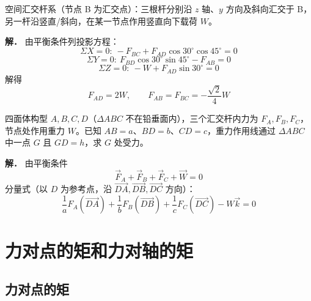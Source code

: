 \begin{example}
空间汇交杆系（节点 B 为汇交点）：三根杆分别沿 $z$ 轴、$y$ 方向及斜向汇交于 B，另一杆沿竖直/斜向，在某一节点作用竖直向下载荷 $W$。

\textbf{解．} 由平衡条件列投影方程：
\begin{equation}
\Sigma X=0:\ -F_{BC}+F_{AD}\cos30^\circ\cos45^\circ=0
\label{eq:3-例1-X}
\end{equation}
\begin{equation}
\Sigma Y=0:\ F_{BD}\cos30^\circ\sin45^\circ-F_{AB}=0
\label{eq:3-例1-Y}
\end{equation}
\begin{equation}
\Sigma Z=0:\ -W+F_{AD}\sin30^\circ=0
\label{eq:3-例1-Z}
\end{equation}
解得
\begin{equation}
F_{AD}=2W,\qquad F_{AB}=F_{BC}=-\frac{\sqrt{2}}{4}W
\label{eq:3-例1-结果}
\end{equation}
\end{example}

\begin{example}
四面体构型 $A,B,C,D$（$\Delta ABC$ 不在铅垂面内），三个汇交杆内力为 $F_A,F_B,F_C$，节点处作用重力 $W$。已知 $AB=a$、$BD=b$、$CD=c$，重力作用线通过 $\Delta ABC$ 中一点 $G$ 且 $GD=h$，求 $G$ 处受力。

\textbf{解．} 由平衡条件
\begin{equation}
\vec{F}_A+\vec{F}_B+\vec{F}_C+\vec{W}=0
\label{eq:3-例2-平衡}
\end{equation}
分量式（以 $D$ 为参考点，沿 $\vec{DA},\vec{DB},\vec{DC}$ 方向）：
\begin{equation}
\frac{1}{a}F_A(\vec{DA})+\frac{1}{b}F_B(\vec{DB})+\frac{1}{c}F_C(\vec{DC})-W\vec{k}=0
\label{eq:3-例2-分量}
\end{equation}
\end{example}

\section{力对点的矩和力对轴的矩}

\subsection{力对点的矩}

